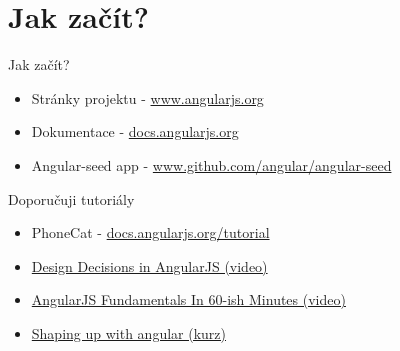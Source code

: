 \documentclass[czech]{beamer}
\begin{document}
    \section{Jak začít?}
    \begin{frame}
        \begin{block}{Jak začít?}
            \begin{itemize}
                \item Stránky projektu - \href{http://angularjs.org/}{www.angularjs.org}
                \item Dokumentace  - \href{http://docs.angularjs.org/}{docs.angularjs.org}
                \item Angular-seed app - \href{http://www.github.com/angular/angular-seed}{www.github.com/angular/angular-seed}
            \end{itemize}
            
        \end{block}
        \begin{block}{Doporučuji tutoriály}
            \begin{itemize}
                \item PhoneCat - \href{http://docs.angularjs.org/tutorial}{docs.angularjs.org/tutorial}
                \item \href{http://youtu.be/HCR7i5F5L8c}{Design Decisions in AngularJS (video)}
                \item \href{http://youtu.be/i9MHigUZKEM}{AngularJS Fundamentals In 60-ish Minutes (video)}
                \item \href{http://campus.codeschool.com/courses/shaping-up-with-angular-js/intro}{Shaping up with angular (kurz)}
            \end{itemize}        
        \end{block}
    \end{frame}
\end{document}
